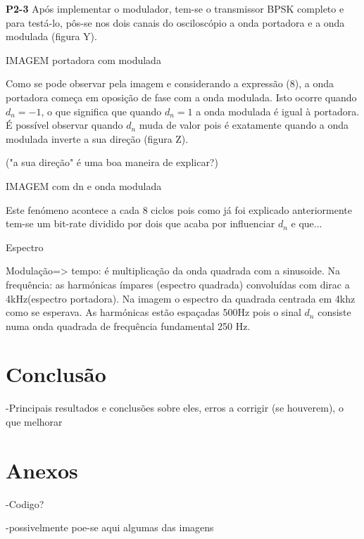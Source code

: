 \documentclass[11pt]{article}
\begin{document}
\textbf{P2-3}
Após implementar o modulador, tem-se o transmissor BPSK completo e para testá-lo, pôs-se nos dois canais do osciloscópio a onda portadora e a onda modulada (figura Y).

IMAGEM portadora com modulada 
\vspace{2 mm}

Como se pode observar pela imagem e considerando a expressão (8), a onda portadora começa em oposição de fase com a onda modulada. Isto ocorre quando $d_n=-1$, o que significa que quando $d_n=1$ a onda modulada é igual à portadora. É possível observar quando $d_n$ muda de valor pois é exatamente quando a onda modulada inverte a sua direção (figura Z). 

("a sua direção" é uma boa maneira de explicar?) 

IMAGEM com dn e onda modulada

Este fenómeno acontece a cada 8 ciclos pois como já foi explicado anteriormente tem-se um bit-rate dividido por dois que acaba por influenciar $d_n$ e que... 
\vspace{2 mm}

Espectro

Modulação=> tempo: é multiplicação da onda quadrada com a sinusoide. Na frequência: as harmónicas ímpares (espectro quadrada) convoluídas com dirac a 4kHz(espectro portadora).
Na imagem o espectro da quadrada centrada em 4khz como se esperava. As harmónicas estão espaçadas 500Hz pois o sinal $d_n$ consiste numa onda quadrada de frequência fundamental 250 Hz.


\section{Conclusão}
-Principais resultados e conclusões sobre eles, erros a corrigir (se houverem), o que melhorar

\section{Anexos}
-Codigo?

-possivelmente poe-se aqui algumas das imagens	
\end{document}
